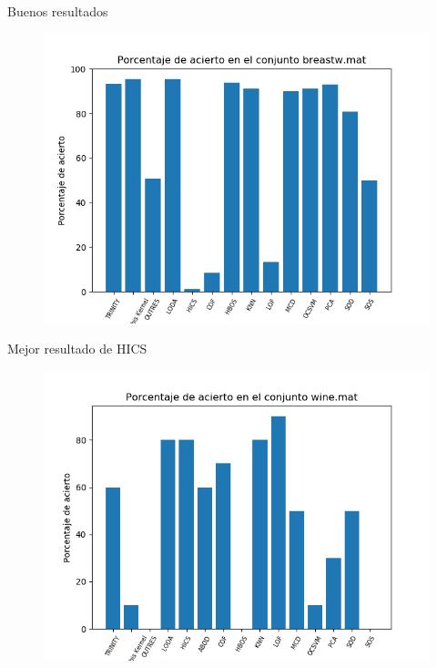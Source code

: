 \documentclass[10pt]{beamer}
\begin{document}
\begin{frame}[fragile]{Buenos resultados}
\vspace{10px}

\begin{figure}
	\centering
	\includegraphics[scale=0.6]{Imagenes/breastw-score}
\end{figure}

\end{frame}

\begin{frame}[fragile]{Mejor resultado de HICS}
\vspace{10px}

\begin{figure}
	\centering
	\includegraphics[scale=0.6]{Imagenes/wine-score}
\end{figure}

\end{frame}
\end{document}

